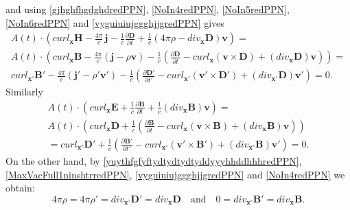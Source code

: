 \documentclass{article}
\theoremstyle{definition}
\theoremstyle{remark}
\renewcommand{\vec}[1]{\mathbf{#1}}
\newcommand{\er}{\eqref}
\newcommand{\er}{\eqref}
\begin{document}
and using \er{gjhghfhgdghdredPPN}, \er{NoIn4redPPN},
\er{NoIn5redPPN}, \er{NoIn6redPPN} and \er{vyguiuiujggghjjgredPPN}
gives
\begin{multline}\label{uiguihjkjkklklklhkkredPPN}
A(t)\cdot\left(curl_{\vec x} \vec H-\frac{4\pi}{c}\,\vec
j-\frac{1}{c}\frac{\partial \vec D}{\partial
t}+\frac{1}{c}\left(4\pi\rho-{div}_{\vec x}\vec
D\right)\vec v\right)=\\
A(t)\cdot\left(curl_{\vec x} \vec B- \frac{4\pi}{c}\left(\vec
j-\rho\vec v\right)-\frac{1}{c}\left(\frac{\partial \vec D}{\partial
t}-curl_{\vec x}\left(\vec v\times\vec D\right)+\left({div}_{\vec
x}\vec D\right)\vec v\right)\right)=\\curl_{\vec x'} \vec B'-
\frac{4\pi}{c}\left(\vec j'-\rho'\vec
v'\right)-\frac{1}{c}\left(\frac{\partial \vec D'}{\partial
t'}-curl_{\vec x'}\left(\vec v'\times\vec
D'\right)+\left({div}_{\vec x'}\vec D\right)\vec v'\right)=0.
\end{multline}
Similarly
\begin{multline}\label{uiguihjkjkklklkljhhjkggkjredPPN}
A(t)\cdot\left(curl_{\vec x} \vec E+\frac{1}{c}\frac{\partial \vec
B}{\partial t}+\frac{1}{c}\left({div}_{\vec x}\vec B\right)\vec
v\right)=\\A(t)\cdot\left(curl_{\vec x} \vec
D+\frac{1}{c}\left(\frac{\partial \vec B}{\partial t}-curl_{\vec
x}\left(\vec v\times\vec B\right)+\left({div}_{\vec x}\vec
B\right)\vec v\right)\right)\\= curl_{\vec x'} \vec
D'+\frac{1}{c}\left(\frac{\partial \vec B'}{\partial t'}-curl_{\vec
x'}\left(\vec v'\times\vec B'\right)+\left({div}_{\vec x'}\vec
B\right)\vec v'\right)=0.
\end{multline}
On the other hand, by \er{yuythfgfyftydtydtydtyddyyyhhddhhhredPPN},
\er{MaxVacFull1ninshtrredPPN}, \er{vyguiuiujggghjjgredPPN} and
\er{NoIn4redPPN} we obtain:
\begin{equation}
\label{vyguiuiujggkkkhjhjjppopredPPN} 4\pi\rho=4\pi\rho'=div_{\vec
x'} \vec D'=div_{\vec x} \vec D\quad\text{and}\quad 0=div_{\vec x'}
\vec B'=div_{\vec x} \vec B.
\end{equation}
%
%
%
%
\end{document}
